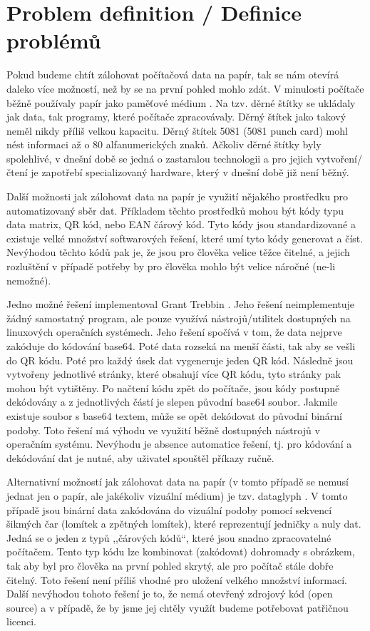 \documentclass[conference]{IEEEtran}
\begin{document}
\section{Problem definition / Definice problémů}

Pokud budeme chtít zálohovat počítačová data na papír, tak se nám otevírá daleko více možností, než by se na první pohled mohlo zdát. V minulosti počítače běžně používaly papír jako paměťové médium \cite{PaperDataStorage}. Na tzv. děrné štítky se ukládaly jak data, tak programy, které počítače zpracovávaly. Děrný štítek jako takový neměl nikdy příliš velkou kapacitu. Děrný štítek 5081 (5081 punch card) mohl nést informaci až o 80 alfanumerických znaků. Ačkoliv děrné štítky byly spolehlivé, v dnešní době se jedná o zastaralou technologii a pro jejich vytvoření/čtení je zapotřebí specializovaný hardware, který v dnešní době již není běžný. 

Další možnosti jak zálohovat data na papír je využití nějakého prostředku pro automatizovaný sběr dat. Příkladem těchto prostředků mohou být kódy typu data matrix, QR kód, nebo EAN čárový kód. Tyto kódy jsou standardizované a existuje velké množství softwarových řešení, které umí tyto kódy generovat a číst. Nevýhodou těchto kódů pak je, že jsou pro člověka velice těžce čitelné, a jejich rozluštění v případě potřeby by pro člověka mohlo být velice náročné (ne-li nemožné).

Jedno možné řešení implementoval Grant Trebbin \cite{GrantTrebbin}. Jeho řešení neimplementuje žádný samostatný program, ale pouze využívá nástrojů/utilitek dostupných na linuxových operačních systémech. Jeho řešení spočívá v tom, že data nejprve zakóduje do kódování base64. Poté data rozseká na menší části, tak aby se vešli do QR kódu. Poté pro každý úsek dat vygeneruje jeden QR kód. Následně jsou vytvořeny jednotlivé stránky, které obsahují více QR kódu, tyto stránky pak mohou být vytištěny. Po načtení kódu zpět do počítače, jsou kódy postupně dekódovány a z jednotlivých částí je slepen původní base64 soubor. Jakmile existuje soubor s base64 textem, může se opět dekódovat do původní binární podoby. Toto řešení má výhodu ve využití běžně dostupných nástrojů v operačním systému. Nevýhodu je absence automatice řešení, tj. pro kódování a dekódování dat je nutné, aby uživatel spouštěl příkazy ručně.

Alternativní možností jak zálohovat data na papír (v tomto případě se nemusí jednat jen o papír, ale jakékoliv vizuální médium) je tzv. dataglyph \cite{DataGlyphsFreePatenstsOnline}\cite{dataglyphs}. V tomto případě jsou binární data zakódována do vizuální podoby pomocí sekvencí šikmých čar (lomítek a zpětných lomítek), které reprezentují jedničky a nuly dat. Jedná se o jeden z typů ,,čárových kódů``, které jsou snadno zpracovatelné počítačem. Tento typ kódu lze kombinovat (zakódovat) dohromady s obrázkem, tak aby byl pro člověka na první pohled skrytý, ale pro počítač stále dobře čitelný. Toto řešení není příliš vhodné pro uložení velkého množství informací. Další nevýhodou tohoto řešení je to, že nemá otevřený zdrojový kód (open source) a v případě, že by jsme jej chtěly využít budeme potřebovat patřičnou licenci.
\end{document}

